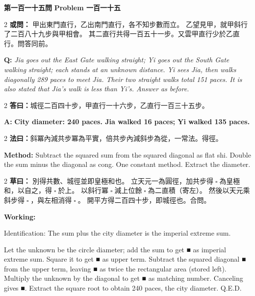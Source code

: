 \documentclass[11pt,a4paper]{article}
\let\origsquare\square
\renewcommand{\square}{\ensuremath{\origsquare}}%
\newcommand{\wen}[1]{%
  \par\vspace{0.5em}%
  \noindent\textcolor{problemcolor}{\textbf{第#1問}}%
  \hfill\textcolor{problemcolor}{\textbf{Problem #1}}\par\nopagebreak%
  \vspace{0.3em}%
}
\newcommand{\owen}[1]{%
  \noindent\textcolor{problemcolor}{\textbf{或問：}}{\tradfont #1}\par\nopagebreak%
}
\newcommand{\oweneng}[1]{%
  \noindent\textcolor{engcolor}{\textbf{Q: }}{\itshape #1}\par\nopagebreak%
}
\newcommand{\fayue}[1]{%
  \noindent\textcolor{methodcolor}{\textbf{法曰：}}{\tradfont #1}\par\nopagebreak%
}
\newcommand{\fayueeng}[1]{%
  \noindent\textcolor{engcolor}{\textbf{Method: }}{#1}\par\nopagebreak%
}
\newcommand{\tsaoyue}[1]{%
  \noindent\textcolor{workcolor}{\textbf{草曰：}}{\tradfont #1}\par%
}
\newcommand{\tsaoyueeng}[1]{%
  \noindent\textcolor{engcolor}{\textbf{Working: }}{\small #1}\par%
}
\newcommand{\dayue}[1]{%
  \noindent\textcolor{anscolor}{\textbf{答曰：}}{\tradfont #1}\par\nopagebreak%
}
\newcommand{\dayueeng}[1]{%
  \noindent\textcolor{engcolor}{\textbf{A: }}{\bfseries #1}\par\nopagebreak%
}
\begin{document}
\vspace{0.5cm}

\wen{一百一十五}

\begin{paracol}{2}
\owen{%
甲出東門直行，乙出南門直行，各不知步數而立。
乙望見甲，就甲斜行了二百八十九步與甲相會。
其二直行共得一百五十一步。又雲甲直行少於乙直行。問答同前。}
\switchcolumn
\oweneng{%
Jia goes out the East Gate walking straight; Yi goes out the South Gate walking straight; each stands at an unknown distance. Yi sees Jia, then walks diagonally 289 paces to meet Jia. Their two straight walks total 151 paces. It is also stated that Jia's walk is less than Yi's. Answer as before.}
\end{paracol}

\begin{paracol}{2}
\dayue{城徑二百四十步，甲直行一十六步，乙直行一百三十五步。}
\switchcolumn
\dayueeng{City diameter: 240 paces. Jia walked 16 paces; Yi walked 135 paces.}
\end{paracol}

\begin{paracol}{2}
\fayue{斜冪內減共步冪為平實，倍共步內減斜步為從，一常法。得徑。}
\switchcolumn
\fayueeng{Subtract the squared sum from the squared diagonal as flat shi. Double the sum minus the diagonal as cong. One constant method. Extract the diameter.}
\end{paracol}

\begin{paracol}{2}
\tsaoyue{%
別得共數、城徑並即皇極和也。
立天元一為圓徑，加共步得$ \; \square \; $為皇極和，以自之，得$ \; \square \; $於上。
以斜行冪$ \; \square \; $減上位餘$ \; \square \; $為二直積（寄左）。
然後以天元乘斜步得$ \; \square \; $，與左相消得$ \; \square \; $。
開平方得二百四十步，即城徑也。合問。}
\switchcolumn
\tsaoyueeng{%
Identification: The sum plus the city diameter is the imperial extreme sum.

Let the unknown be the circle diameter; add the sum to get ■ as imperial extreme sum. Square it to get ■ as upper term. Subtract the squared diagonal ■ from the upper term, leaving ■ as twice the rectangular area (stored left). Multiply the unknown by the diagonal to get ■ as matching number. Canceling gives ■. Extract the square root to obtain 240 paces, the city diameter. Q.E.D.}
\end{paracol}
\end{document}
